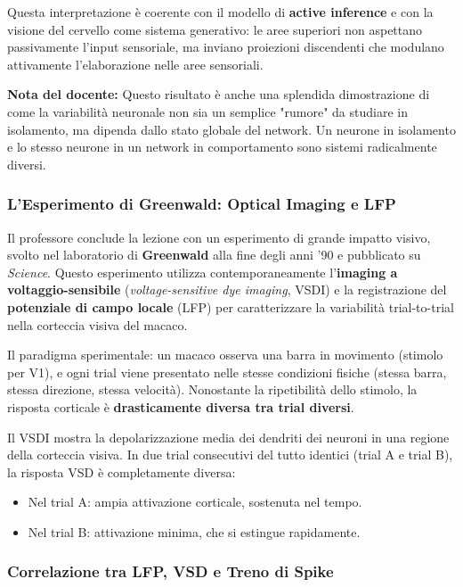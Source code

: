 Questa interpretazione è coerente con il modello di \textbf{active inference} e con la visione del cervello come sistema generativo: le aree superiori non aspettano passivamente l'input sensoriale, ma inviano proiezioni discendenti che modulano attivamente l'elaborazione nelle aree sensoriali.

\begin{tcolorbox}[colback=gray!5, colframe=gray!40, arc=2mm, boxrule=0.5pt]
\textbf{Nota del docente:} Questo risultato è anche una splendida dimostrazione di come la variabilità neuronale non sia un semplice "rumore" da studiare in isolamento, ma dipenda dallo stato globale del network. Un neurone in isolamento e lo stesso neurone in un network in comportamento sono sistemi radicalmente diversi.
\end{tcolorbox}


\subsubsection{L'Esperimento di Greenwald: Optical Imaging e LFP}

Il professore conclude la lezione con un esperimento di grande impatto visivo, svolto nel laboratorio di \textbf{Greenwald} alla fine degli anni '90 e pubblicato su \textit{Science}. Questo esperimento utilizza contemporaneamente l'\textbf{imaging a voltaggio-sensibile} (\textit{voltage-sensitive dye imaging}, VSDI) e la registrazione del \textbf{potenziale di campo locale} (LFP) per caratterizzare la variabilità trial-to-trial nella corteccia visiva del macaco.

Il paradigma sperimentale: un macaco osserva una barra in movimento (stimolo per V1), e ogni trial viene presentato nelle stesse condizioni fisiche (stessa barra, stessa direzione, stessa velocità). Nonostante la ripetibilità dello stimolo, la risposta corticale è \textbf{drasticamente diversa tra trial diversi}.

Il VSDI mostra la depolarizzazione media dei dendriti dei neuroni in una regione della corteccia visiva. In due trial consecutivi del tutto identici (trial A e trial B), la risposta VSD è completamente diversa:
\begin{itemize}
    \item Nel trial A: ampia attivazione corticale, sostenuta nel tempo.
    \item Nel trial B: attivazione minima, che si estingue rapidamente.
\end{itemize}

\subsubsection{Correlazione tra LFP, VSD e Treno di Spike}

